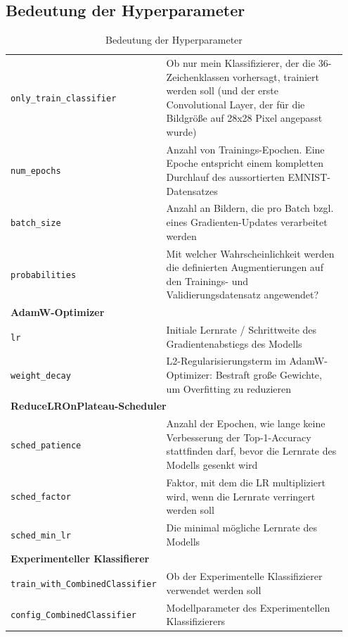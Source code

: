 \documentclass[12pt,oneside]{article}
\begin{document}
  \subsection{Bedeutung der Hyperparameter}
  \begin{table}[h!]
  	\centering
  	\begin{tabular}{|p{0.3\linewidth}|>{\raggedright\arraybackslash}m{0.65\linewidth}|}
  		\hline
  		\rowcolor{lightgray} \multicolumn{1}{|c|}{\textbf{Parameter}} & \multicolumn{1}{c|}{\textbf{Bedeutung}} \\
  		\hline
  		\verb|only_train_classifier| & Ob nur mein Klassifizierer, der die 36-Zeichenklassen vorhersagt, trainiert werden soll (und der erste Convolutional Layer, der für die Bildgröße auf 28x28 Pixel angepasst wurde) \\ 
  		\hline
  		\verb|num_epochs| & Anzahl von Trainings-Epochen. Eine Epoche entspricht einem kompletten Durchlauf des aussortierten EMNIST-Datensatzes \\ 
  		\hline
  		\verb|batch_size| & Anzahl an Bildern, die pro Batch bzgl. eines Gradienten-Updates verarbeitet werden \\ 
  		\hline
  		\verb|probabilities| & Mit welcher Wahrscheinlichkeit werden die definierten Augmentierungen auf den Trainings- und Validierungsdatensatz angewendet? \\ 
  		\hline
  		\multicolumn{2}{|l|}{\small\rule{0pt}{1.5em}\textbf{AdamW-Optimizer}} \\ 
  		\hline
  		\verb|lr| & Initiale Lernrate / Schrittweite des Gradientenabstiegs des Modells \\ 
  		\hline
  		\verb|weight_decay| & L2-Regularisierungsterm im AdamW-Optimizer: Bestraft große Gewichte, um Overfitting zu reduzieren \\ 
  		\hline
  		\multicolumn{2}{|l|}{\small\rule{0pt}{1.5em}\textbf{ReduceLROnPlateau-Scheduler}} \\ 
  		\hline
  		\verb|sched_patience| & Anzahl der Epochen, wie lange keine Verbesserung der Top-1-Accuracy stattfinden darf, bevor die Lernrate des Modells gesenkt wird \\ \hline
  		\verb|sched_factor| & Faktor, mit dem die LR multipliziert wird, wenn die Lernrate verringert werden soll \\ 
  		\hline
  		\verb|sched_min_lr| & Die minimal mögliche Lernrate des Modells \\ 
  		\hline
  		\multicolumn{2}{|l|}{\small\rule{0pt}{1.5em}\textbf{Experimenteller Klassifierer}} \\ 
  		\hline
  		\texttt{train\_with\_\allowbreak CombinedClassifier} & Ob der Experimentelle Klassifizierer verwendet werden soll \\ 
  		\hline
  		\texttt{config\_\allowbreak CombinedClassifier} & Modellparameter des Experimentellen Klassifizierers \\ 
  		\hline
  	\end{tabular}
  	\caption{Bedeutung der Hyperparameter}
  	\label{tab:BedeutungHyperparameter}
  \end{table}
  
\end{document}
